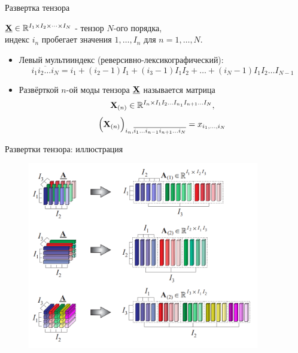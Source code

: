 


\begin{frame}{Развертка тензора}

$\underline{\textbf{X}} \in \mathbb{R}^{I_1 \times I_2 \times \dots \times I_N}$ - тензор $N$-ого порядка, \\
индекс $i_n$ пробегает значения $1, \dots, I_n$ для $n = 1, \dots, N$.
\vspace{0.5cm}
\begin{itemize}
    \item Левый мультииндекс (реверсивно-лексикографический):
    $$ \overline{i_1 i_2 \dots i_N} = i_1 + (i_2 - 1)I_1 + (i_3 - 1)I_1 I_2 + \dots + (i_N - 1)I_1 I_2 \dots I_{N-1}$$
    \item Развёрткой $n$-ой моды тензора $\underline{\textbf{X}}$ называется матрица $$\textbf{X}_{(n)} \in \mathbb{R}^{I_n \times I_1 I_2 \dots I_{n_1} I_{n+1} \dots I_N},$$  
    $$\Big(\textbf{X}_{(n)}\Big)_{i_n, \overline{i_1 \dots i_{n-1} i_{n+1} \dots i_N}} = x_{i_1, \dots, i_N}$$

\end{itemize}

\end{frame}

\begin{frame}{Развертки тензора: иллюстрация}
\begin{figure}
    \centering
    \includegraphics[width=0.9\textwidth]{lecture_11/figs/matricization.png}
\end{figure}
\end{frame}

